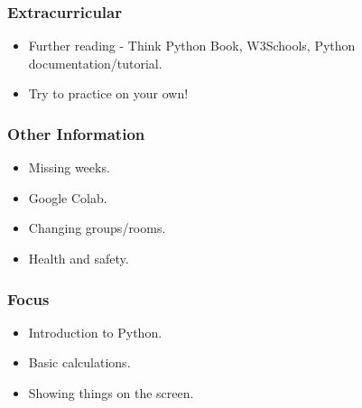 \documentclass{beamer}
\begin{document}
\begin{frame}
	\frametitle{Extracurricular}
	
	\begin{itemize}
		\item{Further reading - Think Python Book, W3Schools,
			Python documentation/tutorial.}
		\item{Try to practice on your own!}
	\end{itemize}
\end{frame}

\begin{frame}
	\frametitle{Other Information}

	\begin{itemize}
		\item{Missing weeks.}
		\item{Google Colab.}
		\item{Changing groups/rooms.}
		\item{Health and safety.}
	\end{itemize}
\end{frame}

\begin{frame}
	\frametitle{Focus}

	\begin{itemize}
		\item{Introduction to Python.}
		\item{Basic calculations.}
		\item{Showing things on the screen.}
	\end{itemize}
\end{frame}
\end{document}

